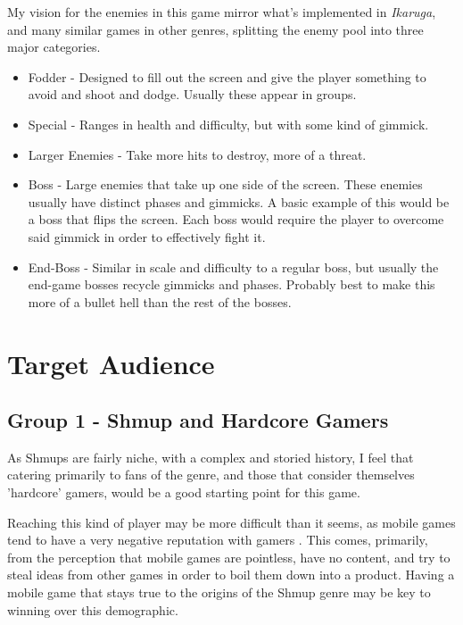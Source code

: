 \documentclass{scrartcl}
\let\citep\autocite
\begin{document}
My vision for the enemies in this game mirror what's implemented in \textit{Ikaruga}, and many similar games in other genres, splitting the enemy pool into three major categories.

\begin{itemize}

  \item Fodder - Designed to fill out the screen and give the player something to avoid and shoot and dodge. Usually these appear in groups.
  \item Special - Ranges in health and difficulty, but with some kind of gimmick.

  \item Larger Enemies - Take more hits to destroy, more of a threat.

  \item Boss - Large enemies that take up one side of the screen. These enemies usually have distinct phases and gimmicks. A basic example of this would be a boss that flips the screen. Each boss would require the player to overcome said gimmick in order to effectively fight it.
  \item End-Boss - Similar in scale and difficulty to a regular boss, but usually the end-game bosses recycle gimmicks and phases. Probably best to make this more of a bullet hell than the rest of the bosses.

\end{itemize}


\section{Target Audience}

\subsection{Group 1 - Shmup and Hardcore Gamers}

As Shmups are fairly niche, with a complex and storied history, I feel that catering primarily to fans of the genre, and those that consider themselves 'hardcore' gamers, would be a good starting point for this game.

Reaching this kind of player may be more difficult than it seems, as mobile games tend to have a very negative reputation with gamers \citep{AndroidAuthority001}. This comes, primarily, from the perception that mobile games are pointless, have no content, and try to steal ideas from other games in order to boil them down into a product. Having a mobile game that stays true to the origins of the Shmup genre may be key to winning over this demographic.
\end{document}
